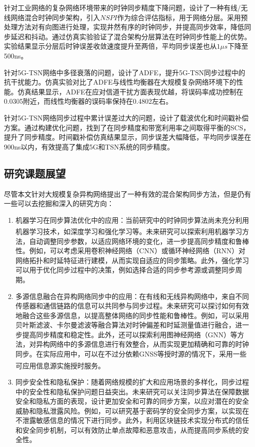 \documentclass[UTF8,a4paper,12pt]{ctexart}
\numberwithin{equation}{section}
\begin{document}
	针对工业网络的复杂网络环境带来的时钟同步精度下降问题，设计了一种有线/无线网络混合时钟同步架构，引入$NSPI$作为综合评估指标，用于网络分层。采用预处理方法对有向图进行处理，实现井然有序的时钟同步，并提高同步效率，降低同步延迟和抖动。通过仿真实验验证了混合架构分层算法在时钟同步性能上的优势。实验结果显示分层后时钟误差收敛速度提升至两倍，平均同步误差也从$1\mu s$下降至500ns。
	
	针对5G-TSN网络中多径衰落的问题，设计了ADFE，提升5G-TSN同步过程中的抗干扰能力。仿真实验对比了ADFE与线性均衡器在大规模复杂网络环境下的性能。仿真结果显示，ADFE在应对信道干扰方面表现优越，将误码率成功控制在0.0305附近，而线性均衡器的误码率保持在0.4802左右。
	
	针对5G-TSN网络同步过程中累计误差过大的问题，设计了载波优化和时间戳补偿方案。通过构建优化问题，找到了在同步精度和带宽利用率之间取得平衡的SCS，提升了同步精度。时间戳补偿仿真结果显示，同步误差大幅降低，平均同步误差在900ns以内，有效提高了集成5G和TSN系统的同步精度。
	
	\subsection{研究课题展望}
	尽管本文针对大规模复杂异构网络提出了一种有效的混合架构同步方法，但是仍有一些可以去挖掘和深入的研究方向：
	
	\begin{enumerate}
		\item 机器学习在同步算法优化中的应用：当前研究中的时钟同步算法尚未充分利用机器学习技术，如深度学习和强化学习等\textsuperscript{\cite{jiqi}}。未来研究可以探索利用机器学习方法，自动调整同步参数，以适应网络环境的变化，进一步提高同步精度和鲁棒性。例如，可以考虑采用卷积神经网络（CNN）或循环神经网络（RNN）对网络拓扑和时延特征进行建模，从而实现自适应的同步策略。此外，强化学习可以用于优化同步过程中的决策，例如选择合适的同步参考源或调整同步周期。
		\item 多源信息融合在异构网络同步中的应用：在有线和无线异构网络中，来自不同传感器和通信链路的信息可以共同参与同步过程。未来研究可以探讨如何有效地融合这些多源信息，以提高整体网络的同步性能和鲁棒性。例如，可以采用贝叶斯滤波、卡尔曼滤波等融合算法对时钟偏差和时延测量值进行融合，进一步提高同步精度和稳定性。此外，还可以探索利用图神经网络（GNN）等方法，对异构网络中的多源信息进行有效整合，从而实现更加精确和可靠的时钟同步。在实际应用中，可以在不过分依赖GNSS等授时源的情况下，采用一些可应用信息源实施授时服务\textsuperscript{\cite{duo}}。
		
		\item 同步安全性和隐私保护：随着网络规模的扩大和应用场景的多样化，同步过程中的安全性和隐私保护问题日益突出。未来研究可以关注同步算法在保障数据安全和隐私方面的表现，设计更加安全和可靠的同步方案，以应对潜在的安全威胁和隐私泄露风险。例如，可以研究基于密码学的安全同步方案，以实现在不泄露敏感信息的情况下进行同步。此外，利用区块链技术实现分布式的信任和安全同步机制，可以有效防止单点故障和恶意攻击，从而提高同步系统的安全性。
	\end{enumerate}
	\newpage
	
	
	
\end{document}
